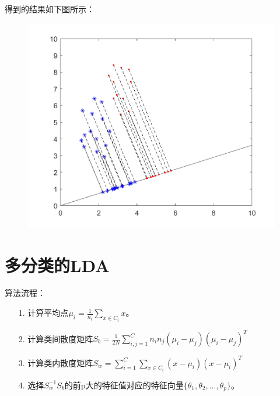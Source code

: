 \documentclass{article}
\begin{document}
得到的结果如下图所示：
\begin{figure}[H]
    \centering
    \includegraphics[width=\linewidth]{1.png}
\end{figure}

\section{多分类的LDA}

算法流程：
\begin{itemize}
    \item [1.] 计算平均点$\mu_i=\frac{1}{n_i}\sum_{x\in C_i}x$。
    \item [2.] 计算类间散度矩阵$S_b=\frac{1}{2N}\sum_{i,j=1}^C n_in_j(\mu_i-\mu_j)(\mu_i-\mu_j)^T$
    \item [3.] 计算类内散度矩阵$S_w=\sum_{i=1}^C\sum_{x\in C_i}(x-\mu_i)(x-\mu_i)^T$
    \item [4.] 选择$S_w^{-1}S_b$的前p大的特征值对应的特征向量$\{\theta_1,\theta_2,...,\theta_p\}$。
\end{itemize}
\end{document}
